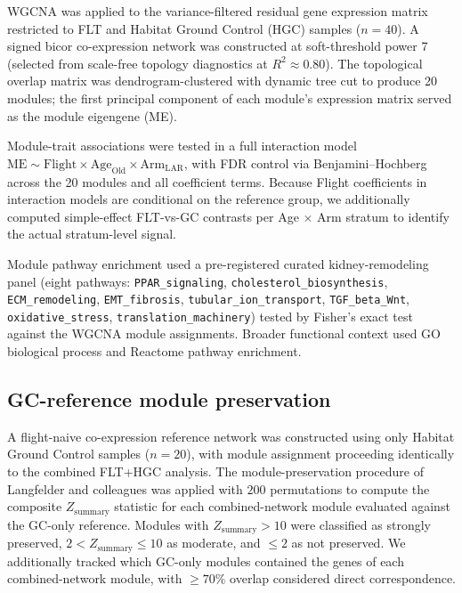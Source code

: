 \documentclass[11pt]{article}
\newcommand{\code}[1]{\texttt{#1}}
\begin{document}
WGCNA \citep{langfelder2008wgcna} was applied to the variance-filtered residual gene expression matrix restricted to FLT and Habitat Ground Control (HGC) samples ($n{=}40$). A signed bicor co-expression network was constructed at soft-threshold power 7 (selected from scale-free topology diagnostics at $R^2\approx 0.80$). The topological overlap matrix was dendrogram-clustered with dynamic tree cut to produce 20 modules; the first principal component of each module's expression matrix served as the module eigengene (ME).

Module-trait associations were tested in a full interaction model $\mathrm{ME} \sim \mathrm{Flight} \times \mathrm{Age}_{\text{Old}} \times \mathrm{Arm}_{\text{LAR}}$, with FDR control via Benjamini--Hochberg across the 20 modules and all coefficient terms. Because Flight coefficients in interaction models are conditional on the reference group, we additionally computed simple-effect FLT-vs-GC contrasts per Age $\times$ Arm stratum to identify the actual stratum-level signal.

Module pathway enrichment used a pre-registered curated kidney-remodeling panel (eight pathways: \code{PPAR\_signaling}, \code{cholesterol\_biosynthesis}, \code{ECM\_remodeling}, \code{EMT\_fibrosis}, \code{tubular\_ion\_transport}, \code{TGF\_beta\_Wnt}, \code{oxidative\_stress}, \code{translation\_machinery}) tested by Fisher's exact test against the WGCNA module assignments. Broader functional context used GO biological process and Reactome pathway enrichment.

\subsection{GC-reference module preservation}

A flight-naive co-expression reference network was constructed using only Habitat Ground Control samples ($n{=}20$), with module assignment proceeding identically to the combined FLT+HGC analysis. The module-preservation procedure of Langfelder and colleagues \citep{langfelder2011module} was applied with $200$ permutations to compute the composite $Z_{\text{summary}}$ statistic for each combined-network module evaluated against the GC-only reference. Modules with $Z_{\text{summary}} > 10$ were classified as strongly preserved, $2 < Z_{\text{summary}} \leq 10$ as moderate, and $\leq 2$ as not preserved. We additionally tracked which GC-only modules contained the genes of each combined-network module, with $\geq 70\%$ overlap considered direct correspondence.
\end{document}
